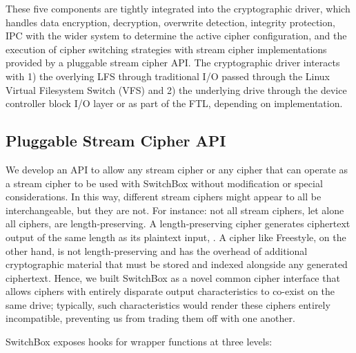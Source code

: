 These five components are tightly integrated into the cryptographic driver,
which handles data encryption, decryption, overwrite detection, integrity
protection, IPC with the wider system to determine the active cipher
configuration, and the execution of cipher switching strategies with stream
cipher implementations provided by a pluggable stream cipher API. The
cryptographic driver interacts with 1) the overlying LFS through traditional I/O
passed through the Linux Virtual Filesystem Switch (VFS) and 2) the underlying
drive through the device controller block I/O layer or as part of the FTL,
depending on implementation.

\subsection{Pluggable Stream Cipher API}

We develop an API to allow any stream cipher or any cipher that can operate as a
stream cipher to be used with SwitchBox without modification or special
considerations. In this way, different stream ciphers might appear to all be
interchangeable, but they are not. For instance: not all stream ciphers, let
alone all ciphers, are length-preserving. A length-preserving cipher generates
ciphertext output of the same length as its plaintext input, . A
cipher like Freestyle, on the other hand, is not length-preserving and has the
overhead of additional cryptographic material that must be stored and indexed
alongside any generated ciphertext. Hence, we built SwitchBox as a novel common
cipher interface that allows ciphers with entirely disparate output
characteristics to co-exist on the same drive; typically, such characteristics
would render these ciphers entirely incompatible, preventing us from trading
them off with one another.

SwitchBox exposes hooks for wrapper functions at three levels:

